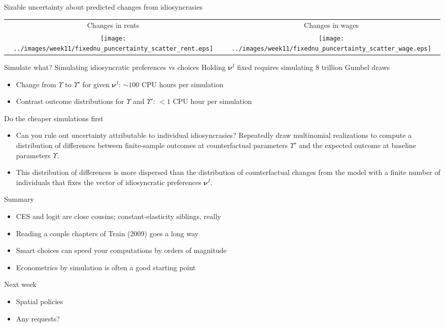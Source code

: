 \documentclass[11pt,notes=hide,aspectratio=169]{beamer}
\begin{document}
\begin{frame}{Sizable uncertainty about predicted changes from idiosyncrasies}
\begin{center}
\begin{tabular}{cc}
{ Changes in rents} & { Changes in wages}\\
\texttt{[image: ../images/week11/fixednu\_puncertainty\_scatter\_rent.eps]}
&
\texttt{[image: ../images/week11/fixednu\_puncertainty\_scatter\_wage.eps]}
\end{tabular}
\end{center}
\end{frame}
\begin{frame}{Simulate what? Simulating idiosyncratic preferences vs choices}
Holding $\boldsymbol \nu^{I}$ fixed requires simulating 8 trillion Gumbel draws
\begin{itemize}
\item Change from $\Upsilon$ to $\Upsilon'$ for given $\boldsymbol \nu^{I}$:
$\sim100$ CPU hours per simulation
\item Contrast outcome distributions for $\Upsilon$ and $\Upsilon'$:
$<1$ CPU hour per simulation
\end{itemize}
Do the cheaper simulations first
\begin{itemize}
\item Can you rule out uncertainty attributable to individual idiosyncrasies?
Repeatedly draw multinomial realizations
to compute a distribution of differences between finite-sample outcomes at counterfactual parameters $\Upsilon'$ and the expected outcome at baseline parameters $\Upsilon$.
\item {This distribution of differences is more dispersed than
the distribution of counterfactual changes from the model with a finite number of individuals that fixes the vector of idiosyncratic preferences $\boldsymbol \nu^{I}$.\par}
\end{itemize}
\end{frame}
\begin{frame}{Summary}
\begin{itemize}
\item CES and logit are close cousins; constant-elasticity siblings, really
\item Reading a couple chapters of Train (2009) goes a long way
\item Smart choices can speed your computations by orders of magnitude
\item Econometrics by simulation is often a good starting point
\end{itemize}
\end{frame}
\begin{frame}{Next week}
\begin{itemize}
\item Spatial policies
\item Any requests?
\end{itemize}
\end{frame}
\end{document}
